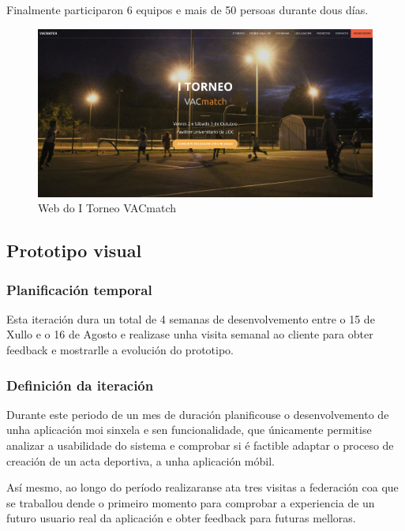     Finalmente participaron 6 equipos e mais de 50 persoas durante dous días.

    \begin{figure}[h!]
          \begin{center}
          \includegraphics[width=\textwidth]{./img/torneo_vacmatch.png}
          \caption{Web do I Torneo VACmatch}
          \end{center}
    \end{figure}

    \subsection{Prototipo visual}

      \subsubsection{Planificación temporal}
      Esta iteración dura un total de 4 semanas de desenvolvemento entre o 15 
de Xullo e o 16 de Agosto e realizase unha visita semanal ao cliente para obter 
feedback e mostrarlle a evolución do prototipo.

      \subsubsection{Definición da iteración}
      Durante este periodo de un mes de duración planificouse o desenvolvemento 
de unha aplicación moi sinxela e sen funcionalidade, que únicamente permitise 
analizar a usabilidade do sistema e comprobar si é factible adaptar o proceso 
de creación de un acta deportiva, a unha aplicación móbil.

    Así mesmo, ao longo do período realizaranse ata tres visitas a federación 
coa que se traballou dende o primeiro momento para comprobar a experiencia de 
un futuro usuario real da aplicación e obter feedback para futuras melloras.


